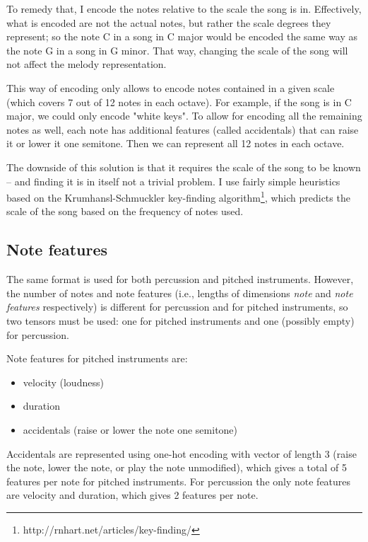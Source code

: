 \documentclass[en]{pracamgr}
\begin{document}
To remedy that, I encode the notes relative to the scale the song is in.
Effectively, what is encoded are not the actual notes, but rather the scale degrees they represent; so the note C in a song in C major would be encoded the same way as the note G in a song in G minor.
That way, changing the scale of the song will not affect the melody representation.

This way of encoding only allows to encode notes contained in a given scale (which covers 7 out of 12 notes in each octave).
For example, if the song is in C major, we could only encode "white keys".
To allow for encoding all the remaining notes as well, each note has additional features (called accidentals) that can raise it or lower it one semitone.
Then we can represent all 12 notes in each octave.

The downside of this solution is that it requires the scale of the song to be known -- and finding it is in itself not a trivial problem.
I use fairly simple heuristics based on the Krumhansl-Schmuckler key-finding algorithm\footnote{http://rnhart.net/articles/key-finding/}, which predicts the scale of the song based on the frequency of notes used.

\subsection{Note features}

The same format is used for both percussion and pitched instruments.
However, the number of notes and note features (i.e., lengths of dimensions \emph{note} and \emph{note features} respectively) is different for percussion and for pitched instruments, so two tensors must be used: one for pitched instruments and one (possibly empty) for percussion.

Note features for pitched instruments are:
\begin{itemize}
    \item velocity (loudness)
    \item duration
    \item accidentals (raise or lower the note one semitone)
\end{itemize}

Accidentals are represented using one-hot encoding with vector of length 3 (raise the note, lower the note, or play the note unmodified), which gives a total of 5 features per note for pitched instruments.
For percussion the only note features are velocity and duration, which gives 2 features per note.
\end{document}
